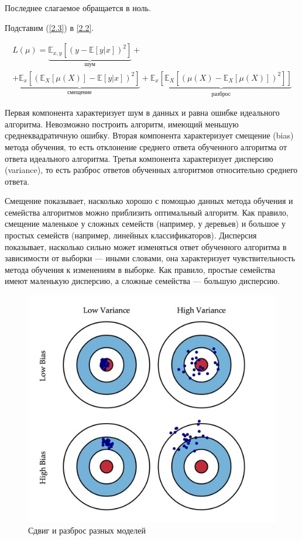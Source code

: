 \documentclass{article}
\theoremstyle{definition}
\theoremstyle{theorem}
\theoremstyle{remark}
\theoremstyle{theorem}
\theoremstyle{example}
\theoremstyle{theorem}
\theoremstyle{theorem}
\theoremstyle{theorem}
\theoremstyle{theorem}
\begin{document}
Последнее слагаемое обращается в ноль.

Подставим (\ref{2.3}) в \ref{2.2}.

\begin{multline}
	L(\mu) = \underbrace{\mathbb{E}_{x,y}\left[(y-\mathbb{E}[y|x])^2\right]}_{\text{шум}} + \\ +
	\underbrace{\mathbb{E}_x\left[\left(\mathbb{E}_X[\mu(X)] - \mathbb{E}[y|x]\right)^2\right]}_{\text{смещение}} + \underbrace{\mathbb{E}_x\left[\mathbb{E}_X\left[(\mu(X) - \mathbb{E}_X[\mu(X)])^2\right]\right]}_{\text{разброс}}
	\label{2.4}
\end{multline}

Первая компонента характеризует шум в данных и равна ошибке идеального алгоритма. Невозможно построить алгоритм, имеющий меньшую среднеквадратичную ошибку. Вторая компонента характеризует смещение (bias) метода обучения, то есть отклонение среднего ответа обученного алгоритма от ответа идеального алгоритма. Третья компонента характеризует дисперсию (variance), то есть разброс ответов обученных алгоритмов относительно среднего ответа. 

Смещение показывает, насколько хорошо с помощью данных метода обучения и семейства алгоритмов можно приблизить оптимальный алгоритм. Как правило, смещение маленькое у сложных семейств (например, у деревьев) и большое у простых семейств (например, линейных классификаторов). Дисперсия показывает, насколько сильно может изменяться ответ обученного алгоритма в зависимости от выборки --- иными словами, она характеризует чувствительность метода обучения к изменениям в выборке. Как правило, простые семейства имеют маленькую дисперсию, а сложные семейства --- большую дисперсию.


\begin{figure}[!ht]
	\centering
	\includegraphics[width=1\textwidth]{bias_var.jpg}
	\caption{Сдвиг и разброс разных моделей}
	\label{fig:bias_var}
\end{figure}
\end{document}
